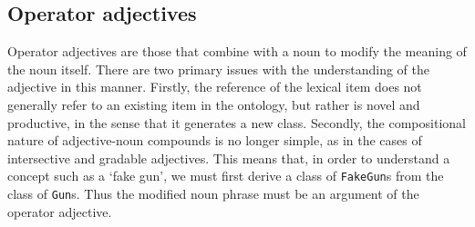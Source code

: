 \documentclass[11pt]{article}
\begin{document}
\subsection{Operator adjectives} \label{sec:operators}

Operator adjectives are those that combine with a noun to modify the meaning of the noun itself. 
There are two primary issues with the understanding of the adjective in this manner. 
Firstly, the reference of the lexical item does not generally refer to an existing item 
in the ontology, but rather is novel and productive, in the sense that it generates a new class. Secondly, the compositional nature 
of adjective-noun compounds is no longer simple, as in the cases of intersective and gradable adjectives.
This means that, in order to understand a concept such as a `fake gun', we must first
derive a class of {\tt FakeGun}s from the class of {\tt Gun}s. Thus the modified noun phrase
must be an argument of the operator adjective.

\end{document}
